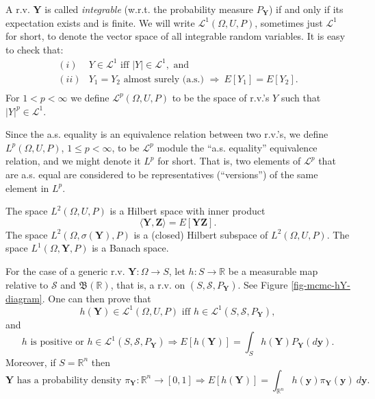A r.v. $\mathbf{Y}$ is called {\it integrable} (w.r.t. the probability measure $P_{\mathbf{Y}}$) if and only if its expectation exists and is finite.
We will write $\mathcal{L}^1(\Omega,U,P)$, sometimes just $\mathcal{L}^1$ for short, to denote the vector space of all integrable random variables.
It is easy to check that:
\[
\begin{array}{rl}
(i)  & Y\in\mathcal{L}^1\text{ iff }|Y|\in\mathcal{L}^1,\text{ and}   \\
(ii) & Y_1=Y_2\text{ almost surely (a.s.) }\Rightarrow~E[Y_1]=E[Y_2]. \\
\end{array}
\]
For $1 < p < \infty$ we define $\mathcal{L}^p(\Omega,U,P)$ to be the space of r.v.'s $Y$ such that $|Y|^p\in\mathcal{L}^1$.

Since the a.s. equality is an equivalence relation between two r.v.'s,
we define $L^p(\Omega,U,P)$, $1\leqslant p < \infty$,
to be $\mathcal{L}^p$ module the ``a.s. equality'' equivalence relation,
and we might denote it $L^p$ for short. That is,
two elements of $\mathcal{L}^p$ that are a.s. equal are considered to be
representatives (``versions'') of the same element in $L^p$.

The space $L^2(\Omega,U,P)$ is a Hilbert space with inner product
\begin{equation*}
\langle \mathbf{Y},\mathbf{Z} \rangle = E[\mathbf{Y}\mathbf{Z}].
\end{equation*}
The space $L^2(\Omega,\sigma(\mathbf{Y}),P)$ is a (closed) Hilbert subspace of $L^2(\Omega,U,P)$.
The space $L^1(\Omega,\mathbf{Y},P)$ is a Banach space.

For the case of a generic r.v. $\mathbf{Y}:\Omega\rightarrow S$,
let $h:S\rightarrow\mathbb{R}$ be a measurable map relative to $\mathcal{S}$ and $\mathfrak{B}(\mathbb{R})$, that is,
a r.v. on $(S,\mathcal{S},P_{\mathbf{Y}})$. See Figure \ref{fig-mcmc-hY-diagram}. One can then prove that \cite{JaPr04}
\begin{equation*}
h(\mathbf{Y})\in\mathcal{L}^1(\Omega,U,P)\text{ iff }h\in\mathcal{L}^1(S,\mathcal{S},P_{\mathbf{Y}}),
\end{equation*}
and
\begin{equation*}
h\text{ is positive or }h\in\mathcal{L}^1(S,\mathcal{S},P_{\mathbf{Y}})
\Rightarrow
E[h(\mathbf{Y})] = \int_S h(\mathbf{Y})P_{\mathbf{Y}}(d\mathbf{y}).
\end{equation*}
Moreover, if $S=\mathbb{R}^n$ then
\begin{equation*}
\mathbf{Y}\text{ has a probability density }\pi_{\mathbf{Y}}:\mathbb{R}^n\rightarrow [0,1]
\Rightarrow
E[h(\mathbf{Y})] = \int_{\mathbb{R}^n}h(\mathbf{y})\pi_{\mathbf{Y}}(\mathbf{y})~d\mathbf{y}.
\end{equation*}

